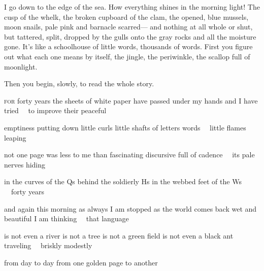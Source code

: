 \newpage %


\begin{poem}
\begin{stanza}
\textsc{I} go down to the edge of the sea.\verseline
How everything shines in the morning light!\verseline
The cusp of the whelk,\verseline
the broken cupboard of the clam,\verseline
the opened, blue mussels,\verseline
moon snails, pale pink and barnacle scarred—\verseline
and nothing at all whole or shut, but tattered, split,\verseline
dropped by the gulls onto the gray rocks and all the moisture gone.\verseline
It's like a schoolhouse\verseline
of little words,\verseline
thousands of words.\verseline
First you figure out what each one means by itself,\verseline
the jingle, the periwinkle, the scallop full of moonlight.
\end{stanza}

\begin{stanza}
Then you begin, slowly, to read the whole story.
\end{stanza}
\end{poem}

\newpage %


\begin{poem}
\begin{stanza}
\textsc{for} forty years\verseline
the sheets of white paper have\verseline
passed under my hands and I have tried\verseline
~~to improve their peaceful
\end{stanza}

\begin{stanza}
emptiness putting down\verseline
little curls little shafts\verseline
of letters words\verseline
~~little flames leaping
\end{stanza}

\begin{stanza}
not one page\verseline
was less to me than fascinating\verseline
discursive full of cadence\verseline
~~its pale nerves hiding
\end{stanza}

\begin{stanza}
in the curves of the Qs\verseline
behind the soldierly Hs\verseline
in the webbed feet of the Ws\verseline
~~forty years
\end{stanza}

\begin{stanza}
and again this morning as always\verseline
I am stopped as the world comes back\verseline
wet and beautiful I am thinking\verseline
~~that language
\end{stanza}

\begin{stanza}
is not even a river\verseline
is not a tree is not a green field\verseline
is not even a black ant traveling\verseline
~~briskly modestly
\end{stanza}

\begin{stanza}
from day to day from one\verseline
golden page to another
\end{stanza}
\end{poem}

